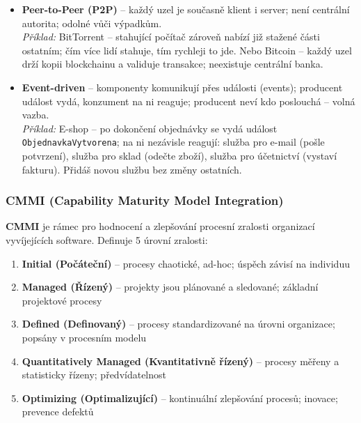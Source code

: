 \begin{itemize}
  \item \textbf{Peer-to-Peer (P2P)} -- každý uzel je současně klient i server; není centrální autorita;
    odolné vůči výpadkům. \\
    \textit{Příklad:} BitTorrent -- stahující počítač zároveň nabízí již stažené části ostatním;
    čím více lidí stahuje, tím rychleji to jde. Nebo Bitcoin -- každý uzel drží kopii blockchainu
    a validuje transakce; neexistuje centrální banka.

  \item \textbf{Event-driven} -- komponenty komunikují přes události (events); producent událost
    vydá, konzument na ni reaguje; producent neví kdo poslouchá -- volná vazba. \\
    \textit{Příklad:} E-shop -- po dokončení objednávky se vydá událost \texttt{ObjednavkaVytvorena};
    na ni nezávisle reagují: služba pro e-mail (pošle potvrzení), služba pro sklad (odečte zboží),
    služba pro účetnictví (vystaví fakturu). Přidáš novou službu bez změny ostatních.
\end{itemize}

\subsubsection{CMMI (Capability Maturity Model Integration)}

\textbf{CMMI} je rámec pro hodnocení a zlepšování procesní zralosti organizací vyvíjejících software.
Definuje 5 úrovní zralosti:

\begin{enumerate}
  \item \textbf{Initial (Počáteční)} -- procesy chaotické, ad-hoc; úspěch závisí na individuu
  \item \textbf{Managed (Řízený)} -- projekty jsou plánované a sledované; základní projektové procesy
  \item \textbf{Defined (Definovaný)} -- procesy standardizované na úrovni organizace; popsány v procesním modelu
  \item \textbf{Quantitatively Managed (Kvantitativně řízený)} -- procesy měřeny a statisticky řízeny; předvídatelnost
  \item \textbf{Optimizing (Optimalizující)} -- kontinuální zlepšování procesů; inovace; prevence defektů
\end{enumerate}

